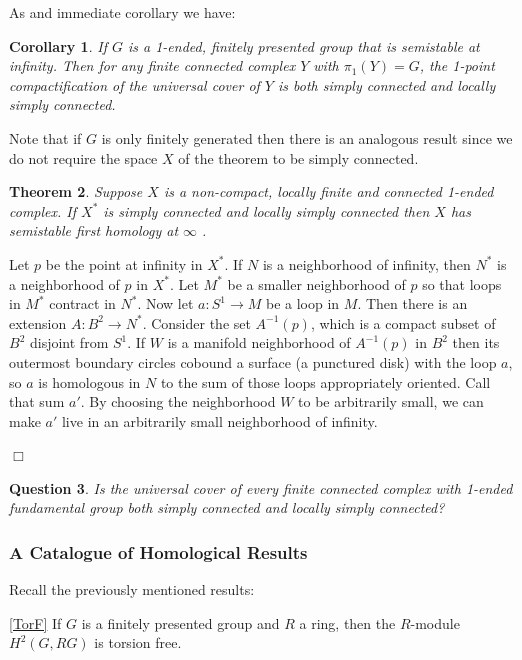 \documentclass[12pt]{article}
\newtheorem{theorem}{Theorem}[subsection]
\newtheorem{corollary}[theorem]{Corollary}
\newtheorem{question}[theorem]{Question}
\newenvironment{proof}{\addvspace{12pt}\noindent{\bf Proof:}}{
$\Box$\par\addvspace{12pt}}
\begin{document}
As and immediate corollary we have:
\begin{corollary}\label{OnePtSC}
If $G$ is a 1-ended, finitely presented group that is semistable at infinity. Then for any finite connected complex $Y$ with $\pi_1(Y)=G$, the 1-point compactification of the universal cover of $Y$ is both simply connected and locally simply connected. 
\end{corollary}
Note that if $G$ is only finitely generated then there is an analogous result since we do not require the space $X$ of the theorem to be simply connected. 

\begin{theorem} Suppose $X$ is a non-compact, locally finite and connected 1-ended complex. If $X^{\ast}$ is simply connected and locally simply connected then $X$ has semistable first homology at $\infty$ . 
\end{theorem}
\begin{proof}
Let $p$ be the point at infinity in $X^\ast$. If $N$ is a neighborhood of infinity, then $N^\ast$ is a neighborhood of $p$ in $X^\ast$. Let $M^\ast$ be a smaller neighborhood of $p$ so that loops in $M^\ast$ contract in $N^\ast$. Now let $a: S^1\to M$ be a loop in $M$. Then there is an extension $A: B^2\to N^\ast$. Consider the set $A^{-1}(p)$, which is a compact subset of $B^2$ disjoint from $S^1$. If $W$ is a manifold neighborhood of $A^{-1}(p)$ in $B^2$ then its outermost boundary circles cobound a surface (a punctured disk) with the loop $a$, so $a$ is homologous in $N$ to the sum of those loops appropriately oriented. Call that sum $a'$.  By choosing the neighborhood $W$ to be arbitrarily small, we can make $a'$ live in an arbitrarily small neighborhood of infinity.
\end{proof}

\begin{question}
Is the universal cover of every finite connected complex with 1-ended fundamental group both simply connected and locally simply connected?
\end{question}
 
 \subsubsection{A Catalogue of Homological Results} \label{CatRe}

Recall the previously mentioned results:
 \medskip
 
 \ref{TorF} If $G$ is a finitely presented group and $R$ a ring, then the $R$-module $H^2(G,RG)$ is torsion free. 
\end{document}
